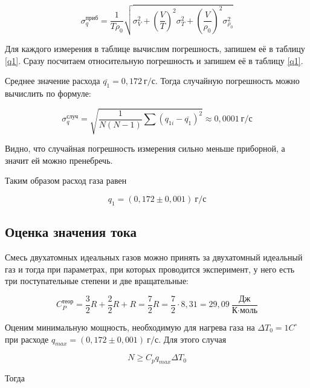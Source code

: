 \documentclass[a4paper,12pt]{article}
\begin{document}
\begin{equation}\label{sigma-q}
    \sigma_q^\text{приб} = \frac{1}{T \rho_0} \sqrt{
    \sigma_{V} ^ 2 +
    \left ( \frac{V}{T} \right )^2 \sigma_{T} ^ 2 +
    \left ( \frac{V}{\rho_0} \right )^2 \sigma_{\rho_0} ^ 2
    }
\end{equation}

Для каждого измерения в таблице вычислим погрешность, запишем её в таблицу \ref{q1}. Сразу посчитаем относительную погрешность и запишем её в таблицу \ref{q1}.

Среднее значение расхода $\overline{q_1} = 0,172 \ \text{г}/\text{с}$. Тогда случайную погрешность можно вычислить по формуле:

\begin{equation}
    \sigma_q^\text{случ} = \sqrt{\frac{1}{N  (N-1)}\sum(q_{1i}-\overline{q_1})^2} \approx 0,0001 \ \text{г}/\text{с}
\end{equation}

Видно, что случайная погрешность измерения сильно меньше приборной, а значит ей можно пренебречь.

Таким образом расход газа равен

\begin{equation}
    q_1 = (0,172 \pm 0,001) \ \text{г}/\text{с}
\end{equation}

\subsection{Оценка значения тока}
\label{N-I-0}

Смесь двухатомных идеальных газов можно принять за двухатомный идеальный газ и тогда при параметрах, при которых проводится эксперимент, у него есть три поступательные степени и две вращательные:

\begin{equation}
    C_{P}^\text{теор} = \frac{3}{2} R + \frac{2}{2} R + R = \frac{7}{2} R = \frac{7}{2} \cdot 8,31 = 29,09 \ \frac{\text{Дж}}{\text{К} \cdot \text{моль}}
\end{equation}

Оценим минимальную мощность, необходимую для нагрева газа на $\Delta T_0 = 1 C^\circ$ при расходе $q_{max} = (0,172 \pm 0,001) \ \text{г}/\text{с}$. Для этого случая

\begin{equation}
    N \ge C_p q_{max} \Delta T_0
\end{equation}

Тогда
\end{document}
